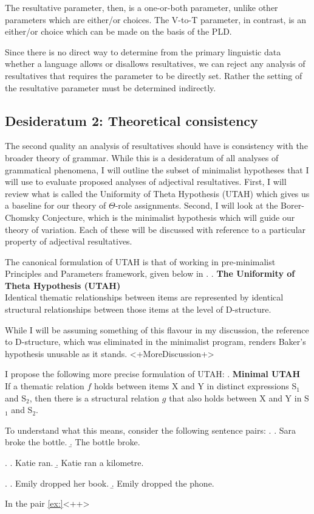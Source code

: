 \documentclass[MilwayThesis]{subfiles}
\begin{document}
The resultative parameter, then, is a one-or-both parameter, unlike other parameters which are either/or choices.
The V-to-T parameter, in contrast, is an either/or choice which can be made on the basis of the PLD.

Since there is no direct way to determine from the primary linguistic data whether a language allows or disallows resultatives, we can reject any analysis of resultatives that requires the parameter to be directly set.
Rather the setting of the resultative parameter must be determined indirectly.

\subsection{Desideratum 2: Theoretical consistency}
The second quality an analysis of resultatives should have is consistency with the broader theory of grammar.
While this is a desideratum of all analyses of grammatical phenomena, I will outline the subset of minimalist hypotheses that I will use to evaluate proposed analyses of adjectival resultatives.
First, I will review what is called the Uniformity of Theta Hypothesis (UTAH) which gives us a baseline for our theory of $\Theta$-role assignments.
Second, I will look at the Borer-Chomsky Conjecture, which is the minimalist hypothesis which will guide our theory of variation.
Each of these will be discussed with reference to a particular property of adjectival resultatives.

The canonical formulation of UTAH is that of \textcite{baker1988incorporation} working in pre-minimalist Principles and Parameters framework, given below in \Next.
\ex. \textbf{The Uniformity of Theta Hypothesis (UTAH)}\\
Identical thematic relationships between items are represented by identical structural relationships between those items at the level of D-structure. \parencite[46]{baker1988incorporation}

While I will be assuming something of this flavour in my discussion, the reference to D-structure, which was eliminated in the minimalist program, renders Baker's hypothesis unusable as it stands.
<+MoreDiscussion+>

I propose the following more precise formulation of UTAH:
\ex. \textbf{Minimal UTAH}\\
If a thematic relation $f$ holds between items X and Y in distinct expressions S$_1$ and S$_2$, then there is a structural relation $g$ that also holds between X and Y in S$_1$ and S$_2$.

To understand what this means, consider the following sentence pairs:
\ex. \label{ex:broke-bottle}
\a. Sara broke the bottle.
\b. The bottle broke.

\ex. \label{ex:katie-ran}
\a. Katie ran.
\b. Katie ran a kilometre.

\ex. \label{ex:emily-dropped}
\a. Emily dropped her book.
\b. Emily dropped the phone.

In the pair \ref{ex:}<++>
\end{document}
